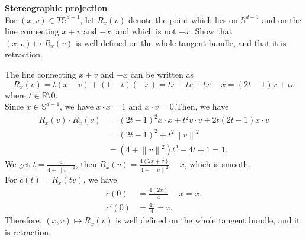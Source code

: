\documentclass[en, oneside]{assignment}
\begin{document}
\begin{prob} \textbf{Stereographic projection}\\
    For $(x, v) \in T\mathbb{S}^{d-1}$, let $R_x(v)$ denote the point which lies on $\mathbb{S}^{d-1}$ 
    and on the line connecting $x+v$ and $-x$, and which is not $-x$.
    Show that $(x, v) \mapsto R_x(v)$ is well defined on the whole tangent bundle, and that it is retraction.
\end{prob}

\begin{sol}
    The line connecting $x+v$ and $-x$ can be written as 
    \begin{equation*}
        R_x(v) = t(x+v) + (1-t)(-x) = tx + tv + tx -x = (2t-1)x + tv
    \end{equation*}
    where $t \in \mathbb{R} \setminus {0}$.\\
    Since $x \in \mathbb{S}^{d-1}$, we have $x \cdot x = 1$ and $x \cdot v = 0$.Then, we have
    \begin{align*}
        R_x(v) \cdot R_x(v) & = (2t-1)^2 x \cdot x + t^2 v \cdot v + 2t(2t-1) x \cdot v\\
        & = (2t-1)^2 + t^2\left\lVert v \right\rVert ^2\\
        & = (4+\left\lVert v \right\rVert ^2)t^2 - 4t + 1 = 1.
    \end{align*}
    We get $t = \frac{4}{4+\left\lVert v \right\rVert ^2}$, then $R_x(v) = \frac{4(2x + v)}{4+\left\lVert v \right\rVert ^2} - x$, which is smooth.\\
    For $c(t) = R_x(tv)$, we have
    \begin{align*}
        c(0) & = \frac{4(2x)}{4} - x = x.\\
        c'(0) & = \frac{4v}{4} = v.
    \end{align*}
    Therefore, $(x, v) \mapsto R_x(v)$ is well defined on the whole tangent bundle, and it is retraction.
\end{sol}
\end{document}
